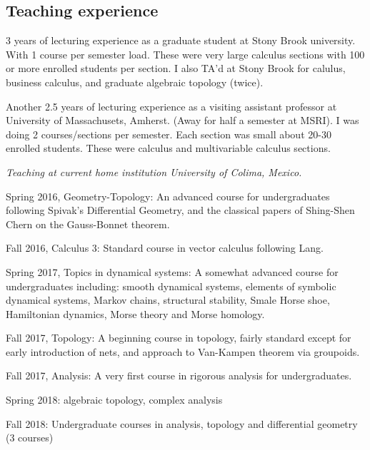 \documentclass[overlapped,line,letterpaper]{res}
\begin{document}
\begin{resume}
\section {\sc Teaching experience}
3 years of lecturing experience as a graduate student at Stony
Brook university. With 1 course per semester load. These were
very large calculus sections with 100 or more enrolled students
per section.  I also TA'd at Stony Brook for calulus, business
calculus, and graduate algebraic topology (twice). 


Another 2.5 years of lecturing experience as a visiting
assistant professor at University of Massachusets, Amherst.  (Away for half a
semester at MSRI).
I was doing 2 courses/sections per semester. Each section was
small about 20-30 enrolled students. 
These were calculus and multivariable calculus sections.


\emph{Teaching at current home institution University of Colima, Mexico.}

Spring 2016, Geometry-Topology: An advanced course for undergraduates following
Spivak's Differential Geometry, and the classical papers of Shing-Shen Chern on
the Gauss-Bonnet theorem.

Fall 2016, Calculus 3: Standard course in vector calculus following Lang.

Spring 2017, Topics in dynamical systems: A somewhat advanced course for
undergraduates including: smooth dynamical systems, elements of
symbolic dynamical systems, Markov chains, structural stability, Smale Horse
shoe, Hamiltonian dynamics, Morse theory
and Morse homology.

Fall 2017, Topology: A beginning course in topology, fairly standard except for
early introduction of nets, and approach to Van-Kampen theorem via groupoids.

Fall 2017, Analysis: A very first course in rigorous analysis for
undergraduates.

Spring 2018: algebraic topology, complex analysis

Fall 2018: Undergraduate courses in analysis, topology and differential geometry (3 courses)


\end{resume}
\end{document}
